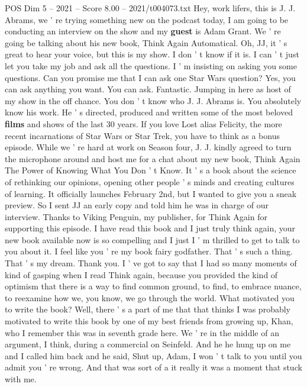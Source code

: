 \begin{textsample}{POS Dim 5 – 2021 – Score 8.00 – 2021/t004073.txt}  \label{ex:f5_pos_073}
Hey, work lifers, this is J.
J.
Abrams, we ' re trying something new on the podcast today, I am going to be conducting an interview on the show and my \textbf{guest} is Adam Grant.
We ' re going be talking about his new book, Think Again Automatical.
Oh, JJ, it ' s great to hear your voice, but this is my show.
I don ' t know if it is.
I can ' t just let you take my job and ask all the questions.
I ' m insisting on asking you some questions.
Can you promise me that I can ask one Star Wars question?
Yes, you can ask anything you want.
You can ask.
Fantastic.
Jumping in here as host of my show in the off chance.
You don ' t know who J.
J.
Abrams is.
You absolutely know his work.
He ' s directed, produced and written some of the most beloved \textbf{films} and shows of the last 30 years.
If you love Lost alias Felicity, the more recent incarnations of Star Wars or Star Trek, you have to think as a bonus episode.
While we ' re hard at work on Season four, J.
J. kindly agreed to turn the microphone around and host me for a chat about my new book, Think Again The Power of Knowing What You Don ' t Know.
It ' s a book about the science of rethinking our opinions, opening other people ' s minds and creating cultures of learning.
It officially launches February 2nd, but I wanted to give you a sneak preview.
So I sent JJ an early copy and told him he was in charge of our interview.
Thanks to Viking Penguin, my publisher, for Think Again for supporting this episode.
I have read this book and I just truly think again, your new book available now is so compelling and I just I ' m thrilled to get to talk to you about it.
I feel like you ' re my book fairy godfather.
That ' s such a thing.
That ' s my dream.
Thank you.
I ' ve got to say that I had so many moments of kind of gasping when I read Think again, because you provided the kind of optimism that there is a way to find common ground, to find, to embrace nuance, to reexamine how we, you know, we go through the world.
What motivated you to write the book?
Well, there ' s a part of me that that thinks I was probably motivated to write this book by one of my best friends from growing up, Khan, who I remember this was in seventh grade here.
We ' re in the middle of an argument, I think, during a commercial on Seinfeld.
And he he hung up on me and I called him back and he said, Shut up, Adam, I won ' t talk to you until you admit you ' re wrong.
And that was sort of a it really it was a moment that stuck with me.

\end{textsample}
